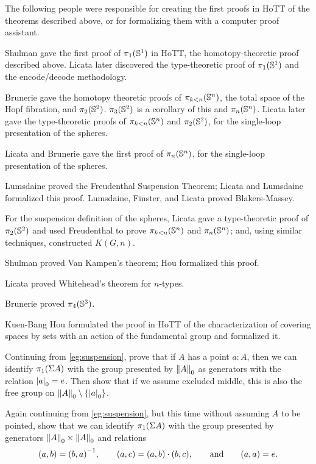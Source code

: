 \sectionNotes

The following people were responsible for creating the first proofs in HoTT of
the theorems described above, or for formalizing them with a computer proof
assistant.

Shulman gave the first proof of $\pi_1(\Sn ^1)$ in HoTT, the
homotopy-theoretic proof described above.  Licata later discovered the
type-theoretic proof of $\pi_1(\Sn ^1)$ and the encode/decode
methodology.

Brunerie gave the homotopy theoretic proofs of $\pi_{k<n}(\Sn ^ n)$, the
total space of the Hopf fibration, and $\pi_2(\Sn ^2)$.  $\pi_3(\Sn ^2)$
is a corollary of this and $\pi_n(\Sn ^n)$.  Licata later gave the
type-theoretic proofs of $\pi_{k<n}(\Sn ^ n)$ and $\pi_2(\Sn ^2)$, for
the single-loop presentation of the spheres.

Licata and Brunerie gave the first proof of $\pi_n(\Sn ^n)$, for the
single-loop presentation of the spheres.

Lumsdaine proved the Freudenthal Suspension Theorem; Licata and
Lumsdaine formalized this proof.  Lumsdaine, Finster, and Licata proved
Blakers-Massey.

For the suspension definition of the spheres, Licata gave a
type-theoretic proof of $\pi_2(\Sn ^2)$ and used Freudenthal to prove
$\pi_{k<n}(\Sn ^n)$ and $\pi_n(\Sn ^n)$; and, using similar techniques,
constructed $K(G,n)$.

Shulman proved Van Kampen's theorem; Hou formalized this proof.  

Licata proved Whitehead's theorem for $n$-types.

Brunerie proved $\pi_4(\Sn ^3)$.  

Kuen-Bang Hou formulated the proof in HoTT of the characterization of covering
spaces by sets with an action of the fundamental group and formalized it.

\sectionExercises

\begin{ex}\label{ex:vksusppt}
  Continuing from \autoref{eg:suspension}, prove that if $A$ has a point $a:A$, then we can identify $\pi_1(\susp A)$ with the group presented by $\trunc0A$ as generators with the relation $\tproj0a = e$.
  Then show that if we assume excluded middle, this is also the free group on $\trunc0 A \setminus \{\tproj0 a \}$.
\end{ex}

\begin{ex}\label{ex:vksuspnopt}
  Again continuing from \autoref{eg:suspension}, but this time without assuming $A$ to be pointed, show that we can identify $\pi_1(\susp A)$ with the group presented by generators $\trunc0A \times \trunc0A$ and relations
  \begin{equation*}
    (a,b) = \opp{(b,a)},
    \qquad
    (a,c) = (a,b)\cdot (b,c),
    \qquad\text{and}\qquad
    (a,a) = e.
  \end{equation*}
\end{ex}

